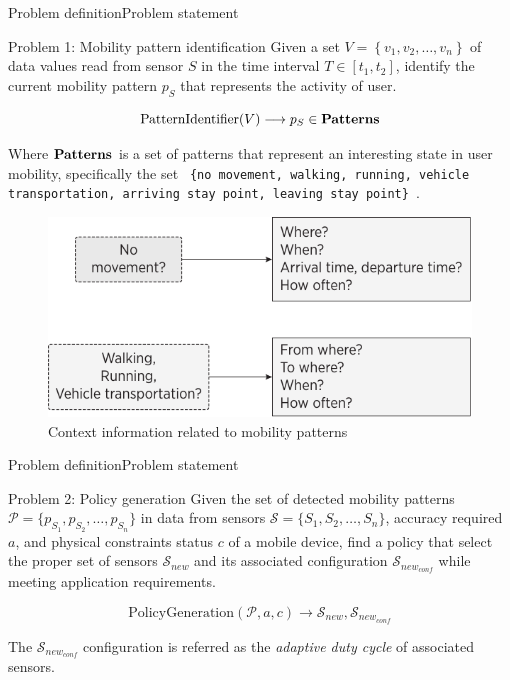 \documentclass[10pt,xcolor={dvipsnames},handout]{beamer}
\begin{document}
\begin{frame}{Problem definition}{Problem statement}
\begin{alertblock}{Problem 1: Mobility pattern identification}
\small
Given a set $V = \left\{v_{1}, v_{2}, \dotsc, v_{n}\right\}$ of data values read from sensor $S$ in the time interval $T  \in [t_{1}, t_{2}]$, identify the current mobility pattern $p_{S}$ that represents the activity of user.

\begin{equation}
  \text{PatternIdentifier}( V ) \longrightarrow{} p_{S} \in \text{\textbf{Patterns}}
\end{equation}

Where $\text{\textbf{Patterns}}$ is a set of patterns that represent an interesting state in user mobility, specifically the set \scriptsize{\texttt{ \{no movement, walking, running, vehicle transportation, arriving stay point, leaving stay point\} }}.
\pause
\begin{figure}[tb]
  \centering
  \includegraphics[scale=0.5]{vectors/mobility-patterns-implications}
  \caption{Context information related to mobility patterns}
  \label{fig:mobility-patterns-implications}
\end{figure}
\end{alertblock}
\end{frame}

\begin{frame}{Problem definition}{Problem statement}
\begin{alertblock}{Problem 2: Policy generation}
\small
Given the set of detected mobility patterns $\mathcal{P} = \{ p_{S_1}, p_{S_2}, \ldots, p_{S_n} \}$ in data from sensors $\mathcal{S} = \{ S_1,S_2,\ldots, S_n \}$, accuracy required $a$, and physical constraints status $c$ of a mobile device, find a policy that select the proper set of sensors $\mathcal{S}_{new}$ and its associated configuration $\mathcal{S}_{new_{conf}}$  while meeting application requirements.

\begin{equation}
  \text{PolicyGeneration}( \mathcal{P}, a, c ) \longrightarrow{} \mathcal{S}_{new}, \mathcal{S}_{new_{conf}}
\end{equation}

The $\mathcal{S}_{new_{conf}}$ configuration is referred as the \emph{adaptive duty cycle} of associated sensors.
\end{alertblock}
\end{frame}
\end{document}
